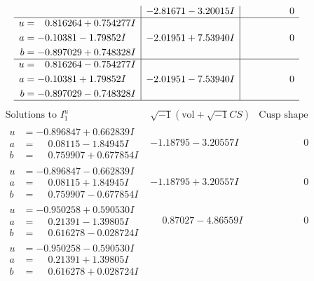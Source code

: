 \documentclass[1p]{elsarticle_modified}
\theoremstyle{definition}
\newcommand{\I}{\sqrt{-1}}
\begin{document}
$$\begin{array}{c|c|c}
 & -2.81671 - 3.20015 I & \phantom{-0.000000 } 0 \\ \hline\begin{aligned}
u &= \phantom{-}0.816264 + 0.754277 I \\
a &= -0.10381 - 1.79852 I \\
b &= -0.897029 + 0.748328 I\end{aligned}
 & -2.01951 + 7.53940 I & \phantom{-0.000000 } 0 \\ \hline\begin{aligned}
u &= \phantom{-}0.816264 - 0.754277 I \\
a &= -0.10381 + 1.79852 I \\
b &= -0.897029 - 0.748328 I\end{aligned}
 & -2.01951 - 7.53940 I & \phantom{-0.000000 } 0\\
 \hline 
 \end{array}$$\newpage$$\begin{array}{c|c|c}  
\text{Solutions to }I^u_{1}& \I (\text{vol} + \sqrt{-1}CS) & \text{Cusp shape}\\
 \hline 
\begin{aligned}
u &= -0.896847 + 0.662839 I \\
a &= \phantom{-}0.08115 - 1.84945 I \\
b &= \phantom{-}0.759907 + 0.677854 I\end{aligned}
 & -1.18795 - 3.20557 I & \phantom{-0.000000 } 0 \\ \hline\begin{aligned}
u &= -0.896847 - 0.662839 I \\
a &= \phantom{-}0.08115 + 1.84945 I \\
b &= \phantom{-}0.759907 - 0.677854 I\end{aligned}
 & -1.18795 + 3.20557 I & \phantom{-0.000000 } 0 \\ \hline\begin{aligned}
u &= -0.950258 + 0.590530 I \\
a &= \phantom{-}0.21391 - 1.39805 I \\
b &= \phantom{-}0.616278 - 0.028724 I\end{aligned}
 & \phantom{-}0.87027 - 4.86559 I & \phantom{-0.000000 } 0 \\ \hline\begin{aligned}
u &= -0.950258 - 0.590530 I \\
a &= \phantom{-}0.21391 + 1.39805 I \\
b &= \phantom{-}0.616278 + 0.028724 I\end{aligned}

\end{array}$$
\end{document}
